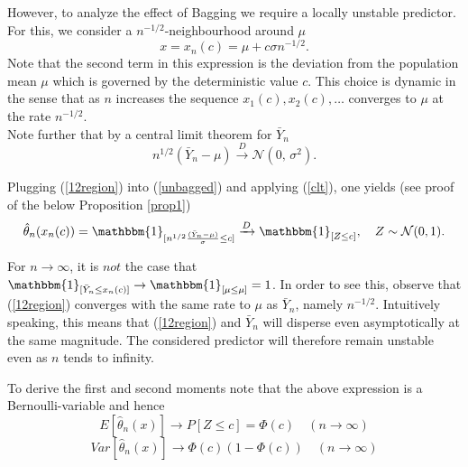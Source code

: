 However, to analyze the effect of Bagging we require a locally unstable predictor.
For this, we consider a $n^{-1/2}$-neighbourhood around $\mu$
\begin{equation}\label{12region}
 x = x_{n}(c)= \mu + c\sigma n^{-1/2}.
\end{equation}
Note that the second term in this expression is the deviation from the population mean $\mu$ which is governed by the deterministic value $c$.
This choice is dynamic in the sense that as $n$ increases the sequence $x_1(c), x_2(c), \dots$ converges to $\mu$ at the rate $n^{-1/2}$.\\
Note further that by a central limit theorem for $\bar{Y}_{n}$
\begin{equation}\label{clt}
n^{1/2}(\bar{Y}_{n} - \mu ) \xrightarrow{D} \mathcal{N}(0,\,\sigma^{2}).
\end{equation}

Plugging (\ref{12region}) into (\ref{unbagged}) and applying (\ref{clt}), one yields (see proof of the below Proposition \ref{prop1})
$$\hat{\theta}_{n}(x_n(c))=\mathbbm{1}_{[n^{1/2}\frac{(\bar{Y}_{n} - \mu )}{\sigma} \leq c]} \xrightarrow{D} \mathbbm{1}_{[Z \leq c]}, \quad
Z \sim \mathcal{N}(0,1).$$

\begin{remark}
For $n \rightarrow \infty$, it is $not$ the case that $\mathbbm{1}_{[\bar{Y}_{n} \leq x_n(c)]} \rightarrow \mathbbm{1}_{[\mu \leq \mu]}=1$.
In order to see this, observe that (\ref{12region}) converges with the same rate to $\mu$ as $\bar{Y}_n$, namely $n^{-1/2}$.
Intuitively speaking, this means that (\ref{12region}) and $\bar{Y}_n$ will disperse even asymptotically at the same magnitude.
The considered predictor will therefore remain unstable even as $n$ tends to infinity.
\end{remark}

To derive the first and second moments note that the above expression is a Bernoulli-variable and hence
$$E[\hat{\theta}_{n}(x)] \rightarrow P[Z \leq c] = \Phi(c)\quad (n \rightarrow \infty)$$
$$Var[\hat{\theta}_{n}(x)] \rightarrow \Phi(c)(1-\Phi(c)) \quad(n \rightarrow \infty)$$

